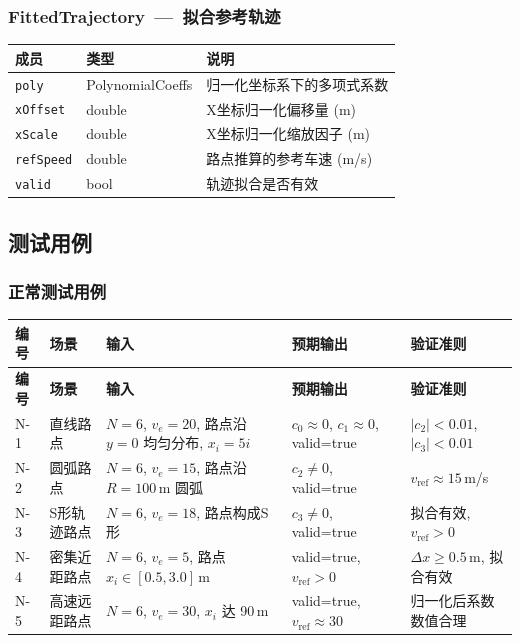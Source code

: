 \documentclass[a4paper,10pt]{article}
\begin{document}
\subsubsection{FittedTrajectory~---~拟合参考轨迹}
\begin{longtable}{|L{3.5cm}|C{2cm}|L{9.5cm}|}
\hline
\textbf{成员} & \textbf{类型} & \textbf{说明} \\
\hline
\texttt{poly} & PolynomialCoeffs & 归一化坐标系下的多项式系数 \\
\hline
\texttt{xOffset} & double & X坐标归一化偏移量 (m) \\
\hline
\texttt{xScale} & double & X坐标归一化缩放因子 (m) \\
\hline
\texttt{refSpeed} & double & 路点推算的参考车速 (m/s) \\
\hline
\texttt{valid} & bool & 轨迹拟合是否有效 \\
\hline
\end{longtable}

\subsection{测试用例}

\subsubsection{正常测试用例}

{\small
\begin{longtable}{|C{0.6cm}|L{2.2cm}|L{4.8cm}|L{4.0cm}|L{3.5cm}|}
\hline
\textbf{编号} & \textbf{场景} & \textbf{输入} & \textbf{预期输出} & \textbf{验证准则} \\
\hline
\endfirsthead
\hline
\textbf{编号} & \textbf{场景} & \textbf{输入} & \textbf{预期输出} & \textbf{验证准则} \\
\hline
\endhead
N-1 &
直线路点 &
$N{=}6$, $v_e{=}20$, 路点沿 $y{=}0$ 均匀分布, $x_i{=}5i$ &
$c_0{\approx}0$, $c_1{\approx}0$, valid=true &
$|c_2|{<}0.01$, $|c_3|{<}0.01$ \\
\hline
N-2 &
圆弧路点 &
$N{=}6$, $v_e{=}15$, 路点沿 $R{=}100$\,m 圆弧 &
$c_2 \neq 0$, valid=true &
$v_{\text{ref}} \approx 15$\,m/s \\
\hline
N-3 &
S形轨迹路点 &
$N{=}6$, $v_e{=}18$, 路点构成S形 &
$c_3 \neq 0$, valid=true &
拟合有效, $v_{\text{ref}} > 0$ \\
\hline
N-4 &
密集近距路点 &
$N{=}6$, $v_e{=}5$, 路点 $x_i \in [0.5, 3.0]$\,m &
valid=true, $v_{\text{ref}} > 0$ &
$\Delta x \geq 0.5$\,m, 拟合有效 \\
\hline
N-5 &
高速远距路点 &
$N{=}6$, $v_e{=}30$, $x_i$ 达 90\,m &
valid=true, $v_{\text{ref}} \approx 30$ &
归一化后系数数值合理 \\
\hline
\end{longtable}
}
\end{document}
